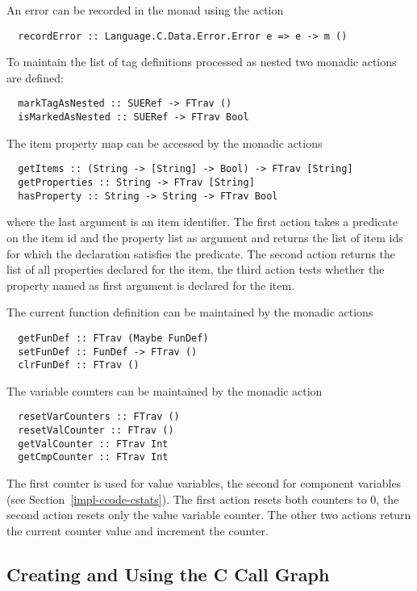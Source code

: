 An error can be recorded in the monad using the action
\begin{verbatim}
  recordError :: Language.C.Data.Error.Error e => e -> m () 
\end{verbatim}

To maintain the list of tag definitions processed as nested two monadic actions are defined:
\begin{verbatim}
  markTagAsNested :: SUERef -> FTrav ()
  isMarkedAsNested :: SUERef -> FTrav Bool
\end{verbatim}

The item property map can be accessed by the monadic actions
\begin{verbatim}
  getItems :: (String -> [String] -> Bool) -> FTrav [String]
  getProperties :: String -> FTrav [String]
  hasProperty :: String -> String -> FTrav Bool
\end{verbatim}
where the last  argument is an item identifier.  The first action takes a predicate 
on the item id and the property list as argument and returns the list of item ids for which the declaration satisfies
the predicate. 
The second action returns the list of all properties declared 
for the item, the third action tests whether the property named as first argument is declared for the item.

The current function definition can be maintained by the monadic actions
\begin{verbatim}
  getFunDef :: FTrav (Maybe FunDef)
  setFunDef :: FunDef -> FTrav ()
  clrFunDef :: FTrav ()
\end{verbatim}

The variable counters can be maintained by the monadic action
\begin{verbatim}
  resetVarCounters :: FTrav ()
  resetValCounter :: FTrav ()
  getValCounter :: FTrav Int
  getCmpCounter :: FTrav Int
\end{verbatim}
The first counter is used for value variables, the second for component variables (see Section~\ref{impl-ccode-cstats}).
The first action resets both counters to 0, the second action resets only the value variable counter. 
The other two actions return the current counter value and increment the counter.

\subsection{Creating and Using the C Call Graph}
\label{impl-ccode-callgraph}

